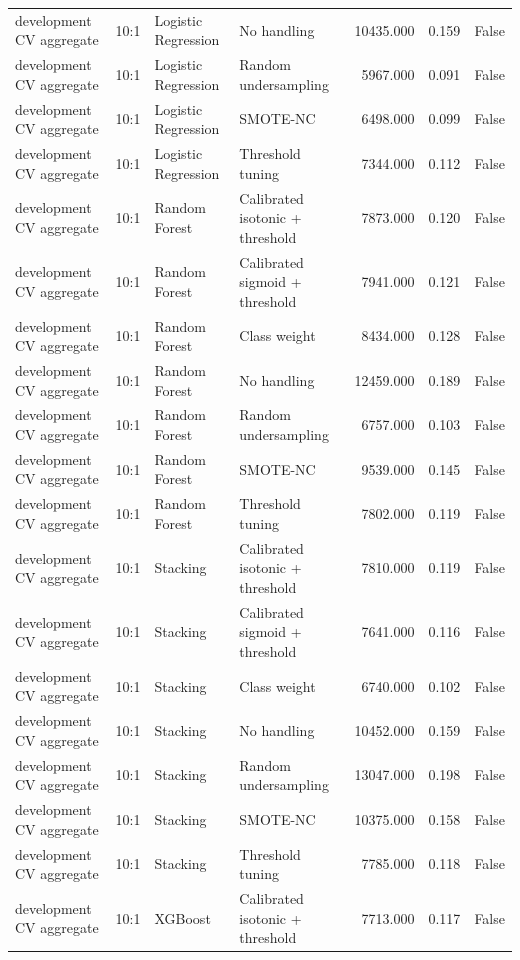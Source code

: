 \begin{tabular}{llllrrr}
development CV aggregate & 10:1 & Logistic Regression & No handling & 10435.000 & 0.159 & False \\
development CV aggregate & 10:1 & Logistic Regression & Random undersampling & 5967.000 & 0.091 & False \\
development CV aggregate & 10:1 & Logistic Regression & SMOTE-NC & 6498.000 & 0.099 & False \\
development CV aggregate & 10:1 & Logistic Regression & Threshold tuning & 7344.000 & 0.112 & False \\
development CV aggregate & 10:1 & Random Forest & Calibrated isotonic + threshold & 7873.000 & 0.120 & False \\
development CV aggregate & 10:1 & Random Forest & Calibrated sigmoid + threshold & 7941.000 & 0.121 & False \\
development CV aggregate & 10:1 & Random Forest & Class weight & 8434.000 & 0.128 & False \\
development CV aggregate & 10:1 & Random Forest & No handling & 12459.000 & 0.189 & False \\
development CV aggregate & 10:1 & Random Forest & Random undersampling & 6757.000 & 0.103 & False \\
development CV aggregate & 10:1 & Random Forest & SMOTE-NC & 9539.000 & 0.145 & False \\
development CV aggregate & 10:1 & Random Forest & Threshold tuning & 7802.000 & 0.119 & False \\
development CV aggregate & 10:1 & Stacking & Calibrated isotonic + threshold & 7810.000 & 0.119 & False \\
development CV aggregate & 10:1 & Stacking & Calibrated sigmoid + threshold & 7641.000 & 0.116 & False \\
development CV aggregate & 10:1 & Stacking & Class weight & 6740.000 & 0.102 & False \\
development CV aggregate & 10:1 & Stacking & No handling & 10452.000 & 0.159 & False \\
development CV aggregate & 10:1 & Stacking & Random undersampling & 13047.000 & 0.198 & False \\
development CV aggregate & 10:1 & Stacking & SMOTE-NC & 10375.000 & 0.158 & False \\
development CV aggregate & 10:1 & Stacking & Threshold tuning & 7785.000 & 0.118 & False \\
development CV aggregate & 10:1 & XGBoost & Calibrated isotonic + threshold & 7713.000 & 0.117 & False \\

\end{tabular}

